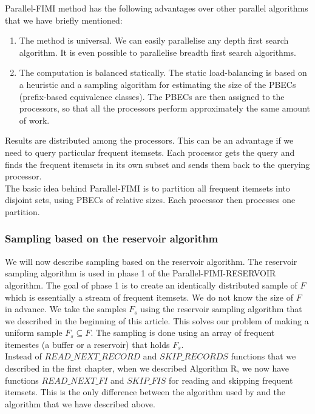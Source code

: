 \documentclass[journal]{IEEEtran/IEEEtran}
\begin{document}
Parallel-FIMI method has the following advantages over other parallel algorithms that we have briefly mentioned:
\begin{enumerate}
\item The method is universal. We can easily parallelise any depth first search algorithm. It is even possible to parallelise breadth first search algorithms.
\item The computation is balanced statically. The static load-balancing is based on a heuristic and a sampling algorithm for estimating the size of the PBECs (prefix-based equivalence classes). The PBECs are then assigned to the processors, so that all the processors perform approximately the same amount of work.
\end{enumerate}

Results are distributed among the processors. This can be an advantage if we need to query particular frequent itemsets. Each processor gets the query and finds the frequent itemsets in its own subset and sends them back to the querying processor.\\

The basic idea behind Parallel-FIMI is to partition all frequent itemsets into disjoint sets, using PBECs of relative sizes. Each processor then processes one partition.\\
\subsubsection*{Sampling based on the reservoir algorithm}
We will now describe sampling based on the reservoir algorithm. The reservoir sampling algorithm is used in phase 1 of the Parallel-FIMI-RESERVOIR algorithm. The goal of phase 1 is to create an identically distributed sample of $F$ which is essentially a stream of frequent itemsets. We do not know the size of $F$ in advance. We take the samples $F_s$ using the reservoir sampling algorithm that we described in the beginning of this article. This solves our problem of making a uniform sample $F_s \subseteq F$. The sampling is done using an array of frequent itemestes (a buffer or a reservoir) that holds $F_s$.\\

Instead of $READ\_NEXT\_RECORD$ and $SKIP\_RECORDS$ functions that we described in the first chapter, when we described Algorithm R, we now have functions $READ\_NEXT\_FI$ and $SKIP\_FIS$ for reading and skipping frequent itemsets. This is the only difference between the algorithm used by \cite{kessl} and the algorithm that we have described above.\\
\end{document}
